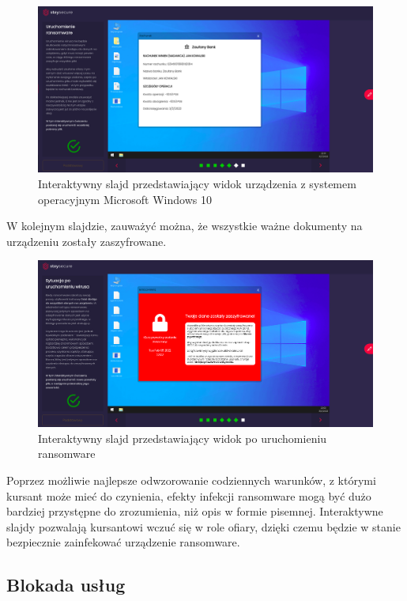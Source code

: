 \documentclass[12pt,twoside]{article}
\begin{document}
\begin{figure}[H]
	\centering
	\includegraphics[width=0.98\linewidth]{figures/ransomware-slide-screenshot3}
	\caption{Interaktywny slajd przedstawiający widok urządzenia z systemem operacyjnym Microsoft Windows 10}
\end{figure}

W kolejnym slajdzie, zauważyć można, że wszystkie ważne dokumenty na urządzeniu zostały zaszyfrowane.


\begin{figure}[H]
	\centering
	\includegraphics[width=1\linewidth]{figures/ransomware-slide-screenshot4}
	\caption{Interaktywny slajd przedstawiający widok po uruchomieniu ransomware}
\end{figure}

Poprzez możliwie najlepsze odwzorowanie codziennych warunków, z którymi kursant może mieć do czynienia, efekty infekcji ransomware mogą być dużo bardziej przystępne do zrozumienia, niż opis w formie pisemnej. Interaktywne slajdy pozwalają kursantowi wczuć się w role ofiary, dzięki czemu będzie w stanie bezpiecznie zainfekować urządzenie ransomware. 

\clearpage
\subsection{Blokada usług}
\end{document}
